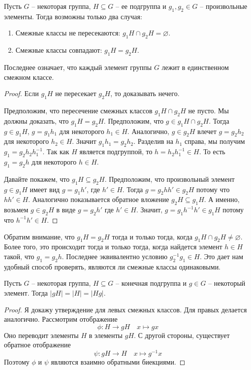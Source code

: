 \begin{claim}
\label{claim::cosets_disj}
Пусть $G$ -- некоторая группа, $H\subseteq G$ -- ее подгруппа и $g_1, g_2\in G$ -- произвольные элементы.
Тогда возможны только два случая:
\begin{enumerate}
\item Смежные классы не пересекаются: $g_1 H \cap g_2 H = \varnothing$.

\item Смежные классы совпадают: $g_1 H = g_2 H$.
\end{enumerate}
Последнее означает, что каждый элемент группы $G$ лежит в единственном смежном классе.
\end{claim}
\begin{proof}
Если $g_1H$ не пересекает $g_2H$, то доказывать нечего.

Предположим, что пересечение смежных классов $g_1 H\cap g_2 H$ не пусто.
Мы должны доказать, что $g_1 H = g_2 H$.
Предположим, что $g\in g_1 H \cap g_2H$.
Тогда $g\in g_1H$, $g = g_1 h_1$ для некоторого $h_1\in H$.
Аналогично, $g\in g_2H$ влечет $g = g_2 h_2$ для некоторого $h_2\in H$.
Значит $g_1 h_1 = g_2 h_2$.
Разделив на $h_1$ справа, мы получим $g_1 = g_2 h_2 h_1^{-1}$.
Так как $H$ является подгруппой, то $h = h_2 h_1^{-1}\in H$.
То есть $g_1 = g_2 h$  для некоторого $h\in H$.

Давайте покажем, что $g_1 H \subseteq g_2 H$.
Предположим, что произвольный элемент $g\in g_1H$ имеет вид $g = g_1 h'$, где $h'\in H$.
Тогда $g =g_2 h h'\in g_2 H$ потому что $hh'\in H$.
Аналогично показывается обратное вложение $g_2 H \subseteq g_1 H$.
А именно, возьмем $g\in g_2H$ в виде $g = g_2 h'$ где $h'\in H$.
Значит, $g = g_1 h^{-1}h'\in g_1 H$ потому что $h^{-1}h'\in H$.
\end{proof}

\begin{remark}
Обратим внимание, что $g_1 H  = g_2H$ тогда и только тогда, когда $g_1 H \cap g_2 H \neq \varnothing$.
Более того, это происходит тогда и только тогда, когда найдется элемент $h\in H$ такой, что $g_1 = g_2 h$.
Последнее эквивалентно условию $g_2^{-1}g_1 \in H$.
Это дает нам удобный способ проверять, являются ли смежные классы одинаковыми.
\end{remark}

\begin{claim}
\label{claim::cosets_size}
Пусть $G$ -- некоторая группа, $H\subseteq G$ -- конечная подгруппа и $g\in G$ -- некоторый элемент.
Тогда $|gH| = |H| = |Hg|$.
\end{claim}
\begin{proof}
Я докажу утверждение для левых смежных классов.
Для правых делается аналогично.
Рассмотрим отображение
\[
\phi \colon H \to g H\quad x \mapsto gx
\]
Оно переводит элементы $H$ в элементы $gH$.
С другой стороны, существует обратное отображение
\[
\psi \colon gH \to H\quad x \mapsto g^{-1}x
\]
Поэтому $\phi$ и $\psi$ являются взаимно обратными биекциями.
\end{proof}

